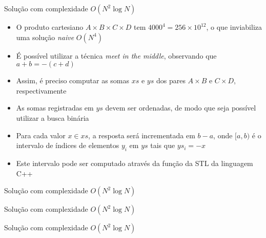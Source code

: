 \begin{frame}[fragile]{Solução com complexidade $O(N^2\log N)$}

    \begin{itemize}
        \item O produto cartesiano $A\times B\times C\times D$ tem  $4000^4 = 256 \times 10^{12}$,
            o que inviabiliza uma solução \textit{naive} $O(N^4)$

        \item É possível utilizar a técnica \textit{meet in the middle}, observando que
            $a + b = -(c + d)$

        \item Assim, é preciso computar as somas $xs$ e $ys$ dos pares $A\times B$ e $C\times D$,
            respectivamente

        \item As somas registradas em $ys$ devem ser ordenadas, de modo que seja possível 
            utilizar a busca binária
            
        \item Para cada valor $x\in xs$, a resposta será incrementada em $b - a$, onde 
            $[a, b)$ é o intervalo de índices de elementos $y_i$ em $ys$ tais que $ys_i = -x$

        \item Este intervalo pode ser computado através da função 
            da STL da linguagem C++

   \end{itemize}

\end{frame}

\begin{frame}[fragile]{Solução com complexidade $O(N^2\log N)$}
\end{frame}

\begin{frame}[fragile]{Solução com complexidade $O(N^2\log N)$}
\end{frame}

\begin{frame}[fragile]{Solução com complexidade $O(N^2\log N)$}
\end{frame}
